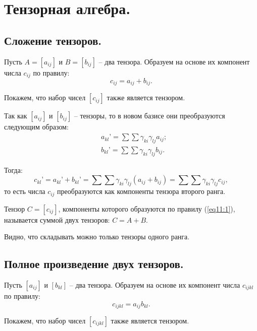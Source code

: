 \section{Тензорная алгебра.}

\subsection{Сложение тензоров.}

	Пусть \( A = [a_{ij}] \) и \( B = [b_{ij}] \) -- два тензора. Образуем на основе их компонент числа \( c_{ij} \) по правилу:
	\begin{equation}
	c_{ij} = a_{ij} + b_{ij}. \label{eq11:1}
	\end{equation}
	
	Покажем, что набор чисел \( [c_{ij}] \) также является тензором.
	
	Так как \( [a_{ij}] \) и \( [b_{ij}] \) -- тензоры, то в новом базисе они преобразуются следующим образом:
	\begin{align}
	& a_{kl}{’} = \sum\sum \gamma_{ki}\gamma_{lj}a_{ij}; \nonumber \\
	& b_{kl}{’} = \sum\sum \gamma_{ki}\gamma_{lj}b_{ij}. \nonumber
	\end{align}
	
	Тогда:
	\[ c_{kl}{’} = a_{kl}{’} + b_{kl}{’} = \sum\sum \gamma_{ki}\gamma_{lj}(a_{ij} + b_{ij}) = \sum\sum \gamma_{ki}\gamma_{lj}c_{ij}, \]
	то есть числа \( c_{ij} \) преобразуются как компоненты тензора второго ранга.
	
	\begin{definition}
	Тензор \( C = [c_{ij}] \), компоненты которого образуются по правилу (\ref{eq11:1}), называется суммой двух тензоров: \( C = A + B \).
	\end{definition}
	
	Видно, что складывать можно только тензоры одного ранга.

\subsection{Полное произведение двух тензоров.}

	Пусть \( [a_{ij}] \) и \( [b_{kl}] \) -- два тензора. Образуем на основе их компонент числа \( c_{ijkl} \) по правилу:
	\begin{equation}
		c_{ijkl} = a_{ij}b_{kl}. \label{eq11:2}
	\end{equation}
	
	Покажем, что набор чисел \( [c_{ijkl}] \) также является тензором.
	
